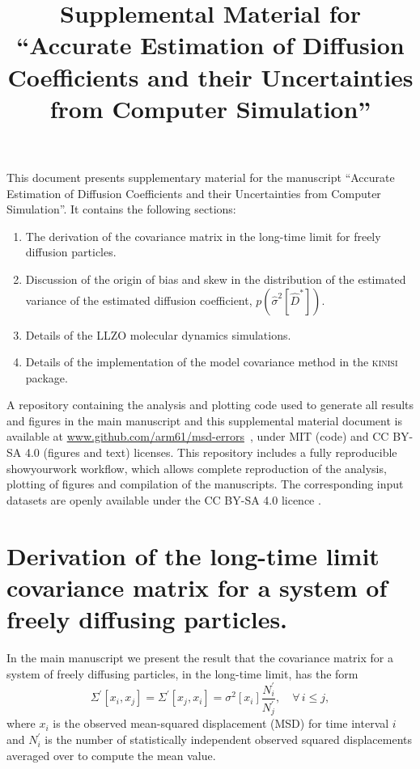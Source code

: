 \documentclass[reprint,superscriptaddress,nobibnotes,amsmath,amssymb,aps,prx,hidelinks,linenumbers]{revtex4-2}
\makeatletter
\newcommand{\papertitle}{Accurate Estimation of Diffusion Coefficients and their Uncertainties from Computer Simulation}
\newcommand{\oMSDi}{\ensuremath{x_i}}
\newcommand{\oMSDj}{\ensuremath{x_j}}
\newcommand{\prob}[1]{\ensuremath{p(#1)}}
\newcommand{\nind}[1]{\ensuremath{N^\prime_{#1}}}
\newcommand{\code}[1]{#1}
\newcommand{\Dest}{\ensuremath{\widehat{D}^*}}
\newcommand{\var}[1]{\ensuremath{\sigma^2[#1]}}
\newcommand{\varest}[1]{\ensuremath{\widehat{\sigma}^2[#1]}}
\def\maketitle{
\@author@finish
\title@column\titleblock@produce
\suppressfloats[t]}
\makeatother
\begin{document}
\title{Supplemental Material for ``\papertitle''}
\maketitle

This document presents supplementary material for the manuscript ``\papertitle''.
It contains the following sections:
\begin{enumerate}
    \item The derivation of the covariance matrix in the long-time limit for freely diffusion particles.
    \item Discussion of the origin of bias and skew in the distribution of the estimated variance of the estimated diffusion coefficient, $\prob{\varest{\Dest}}$.
    \item Details of the LLZO molecular dynamics simulations.
    \item Details of the implementation of the model covariance method in the \textsc{kinisi} package.
\end{enumerate}
A repository containing the analysis and plotting code used to generate all results and figures in the main manuscript and this supplemental material document is available at \url{www.github.com/arm61/msd-errors}~\cite{mccluskey_github_2022}, under MIT (code) and CC BY-SA 4.0 (figures and text) licenses.
This repository includes a fully reproducible \code{showyourwork} workflow, which allows complete reproduction of the analysis, plotting of figures and compilation of the manuscripts.
The corresponding input datasets are openly available under the CC BY-SA 4.0 licence \cite{mccluskey_zenodo_2022,coles_llzo_zenodo_2022}. 

\twocolumngrid

\section{Derivation of the long-time limit covariance matrix for a system of freely diffusing particles.}
\label{sec:ran}
In the main manuscript we present the result that the covariance matrix for a system of freely diffusing particles, in the long-time limit, has the form
\begin{equation}
  \Sigma^\prime\left[\oMSDi, \oMSDj\right]= \Sigma^\prime\left[\oMSDj, \oMSDi\right] =
  \var{\oMSDi} \frac{\nind{i}}{\nind{j}},\hspace{1em} \forall\,i \leq j,
  \label{equ:cvv_SI}
\end{equation}
where $\oMSDi$ is the observed mean-squared displacement (MSD) for time interval $i$ and $\nind{i}$ is the number of statistically independent observed squared displacements averaged over to compute the mean value.
\end{document}
